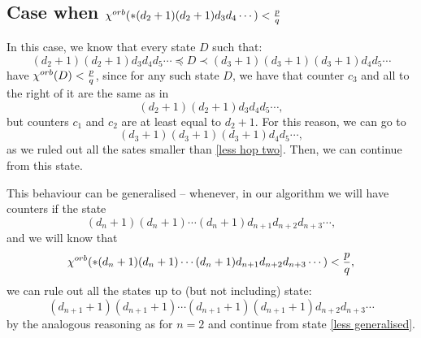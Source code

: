 \subsection{Case when \texorpdfstring{${\chi^{orb}(*(d_2+1)(d_2+1)d_3d_4\cdots)} < \frac{p}{q}$}
{chi^orb(*(d_2+1)(d_2+1)d_3d_4...) < p/q}}\label{Less idea}

In this case, we know that every state $D$ such that:
\begin{equation}
(d_2+1)(d_2+1)d_3d_4d_5\cdots \preceq D\prec (d_3+1)(d_3+1)(d_3+1)d_4d_5\cdots
\end{equation}
have ${\chi^{orb}(D)} < \frac{p}{q}$, since for any such state $D$, we have that 
counter $c_3$ and all to the right of it are the same as in 
\begin{equation}
(d_2+1)(d_2+1)d_3d_4d_5\cdots,
\end{equation}
but counters $c_1$ and $c_2$ are at least equal to $d_2+1$. For this reason, we can 
go to 
\begin{equation}\label{less hop two}
(d_3+1)(d_3+1)(d_3+1)d_4d_5\cdots, 
\end{equation}
as we ruled out all the sates smaller than \ref{less hop two}. Then, we can continue 
from this state.

This behaviour can be generalised -- whenever, in our algorithm we will have counters 
if the state 
\begin{equation}
(d_n+1)(d_n+1)\cdots (d_n + 1)d_{n+1}d_{n+2}d_{n+3}\cdots,
\end{equation} 
and we will know that 
\begin{equation}
{\chi^{orb}(*(d_n+1)(d_n+1)\cdots (d_n + 1)d_{n+1}d_{n+2}d_{n+3}\cdots)} < \frac{p}{q},
\end{equation} 
we can rule out all the states up to (but not including) state:
\begin{equation}\label{less generalised}
(d_{n+1}+1)(d_{n+1}+1)\cdots (d_{n+1} + 1)(d_{n+1}+1)d_{n+2}d_{n+3}\cdots
\end{equation}
by the analogous reasoning as for $n = 2$ and continue from state \ref{less generalised}.

